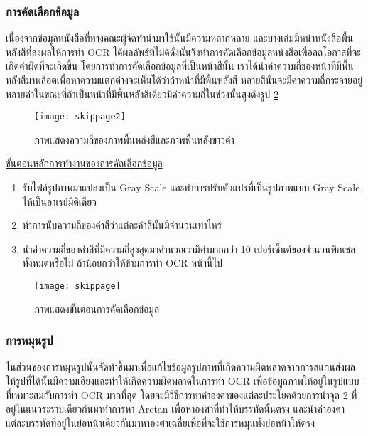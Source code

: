 \subsubsection{การคัดเลือกข้อมูล}
เนื่องจากข้อมูลหนังสือที่ทางคณะผู้จัดทำนำมาใช้นั้นมีความหลากหลาย และบางเล่มมีหน้าหนังสือพื้นหลังสีที่ส่งผลให้การทำ OCR ได้ผลลัพธ์ที่ไม่ดีดั้งนั้นจึงทำการคัดเลือกข้อมูลหนังสือเพื่อลดโอกาสที่จะเกิดคำผิดที่จะเกิดขึ้น 
โดยการทำการคัดเลือกข้อมูลที่เป็นหน้าสีนั้น เราได้นำค่าความถี่ของหน้าที่มีพื้นหลังสีมาพล็อตเพื่อหาความแตกต่างจะเห็นได้ว่าถ้าหน้าที่มีพื้นหลังสี หลายสีนั้นจะมีค่าความถี่กระจายอยู่หลายค่าในขณะที่ถ้าเป็นหน้าที่มีพื้นหลังสีเดียวมีค่าความถี่ในช่วงนั้นสูงดังรูป \ref{fig:skippage}

\begin{figure}[H]
    \centering
    \texttt{[image: skippage2]}
    \caption{ภาพแสดงความถี่ของภาพพื้นหลังสีและภาพพื้นหลังขาวดำ}\label{fig:skippage2}
\end{figure}

\underline{ขั้นตอนหลักการทำงานของการคัดเลือกข้อมูล}

\begin{enumerate}
    \item รับไฟล์รูปภาพมาแปลงเป็น Gray Scale และทำการปรับตัวแปรที่เป็นรูปภาพแบบ Gray Scale ให้เป็นอาเรย์มิติเดียว
    \item ทำการนับความถี่ของค่าสีว่าแต่ละค่าสีนั้นมีจำนวนเท่าไหร่
    \item นำค่าความถี่ของค่าสีที่มีความถี่สูงสุดมาคำนวณว่ามีค่ามากกว่า 10 เปอร์เซ็นต์ของจำนวนพิกเซลทั้งหมดหรือไม่ ถ้าน้อยกว่าให้ข้ามการทำ OCR หน้านี้ไป
\end{enumerate}

\begin{figure}[H]
    \centering
    \texttt{[image: skippage]}
    \caption{ภาพแสดงขั้นตอนการคัดเลือกข้อมูล}\label{fig:skippage}
\end{figure}

\subsubsection{การหมุนรูป}
ในส่วนของการหมุนรูปนั้นจัดทำขึ้นมาเพื่อแก้ไขข้อมูลรูปภาพที่เกิดความผิดพลาดจากการสแกนส่งผลให้รูปที่ได้นั้นมีความเอียงและทำให้เกิดความผิดพลาดในการทำ OCR เพื่อข้อมูลภาพให้อยู่ในรูปแบบที่เหมาะสมกับการทำ OCR มากที่สุด
โดยจะมีวิธีการหาค่าองศาของแต่ละประโยคด้วยการนำจุด 2 ที่อยู่ในแนวระราบเดียวกันมาทำการหา Arctan เพื่อหาองศาที่ทำให้บรรทัดนั้นตรง และนำค่าองศาแต่ละบรรทัดที่อยู่ในย่อหน้าเดียวกันมาหาองศาเฉลี่ยเพื่อที่จะใช้การหมุนทั้งย่อหน้าให้ตรง

